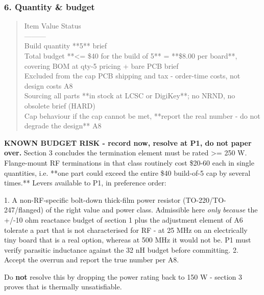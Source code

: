 \documentclass[11pt,a4paper]{article}
\begin{document}
\subsubsection*{6. Quantity \& budget}
\begin{quote}\small\ttfamily\raggedright
\textbar{} Item \textbar{} Value \textbar{} Status \textbar{}\\
\textbar{}---\textbar{}---\textbar{}---\textbar{}\\
\textbar{} Build quantity \textbar{} {*}{*}5{*}{*} \textbar{} brief \textbar{}\\
\textbar{} Total budget \textbar{} {*}{*}\textless{}= \$40 for the build of 5{*}{*} = {*}{*}\$8.00 per board{*}{*}, covering BOM at qty-5 pricing + bare PCB \textbar{} brief \textbar{}\\
\textbar{} Excluded from the cap \textbar{} PCB shipping and tax - order-time costs, not design costs \textbar{} A8 \textbar{}\\
\textbar{} Sourcing \textbar{} all parts {*}{*}in stock at LCSC or DigiKey{*}{*}; no NRND, no obsolete \textbar{} brief (HARD) \textbar{}\\
\textbar{} Cap behaviour \textbar{} if the cap cannot be met, {*}{*}report the real number - do not degrade the design{*}{*} \textbar{} A8 \textbar{}
\end{quote}
\textbf{KNOWN BUDGET RISK - record now, resolve at P1, do not paper over.} Section 3 concludes the termination element must be rated \textgreater{}= 250 W. Flange-mount RF terminations in that class routinely cost \$20-60 each in single quantities, i.e. {*}{*}one part could exceed the entire \$40 build-of-5 cap by several times.{*}{*} Levers available to P1, in preference order:

1. A non-RF-specific bolt-down thick-film power resistor (TO-220/TO-247/flanged) of the right value and power class. Admissible here \emph{only because} the +/-10 ohm reactance budget of section 1 plus the adjustment element of A6 tolerate a part that is not characterised for RF - at 25 MHz on an electrically tiny board that is a real option, whereas at 500 MHz it would not be. P1 must verify parasitic inductance against the 32 nH budget before committing. 2. Accept the overrun and report the true number per A8.

Do \textbf{not} resolve this by dropping the power rating back to 150 W - section 3 proves that is thermally unsatisfiable.
\end{document}
